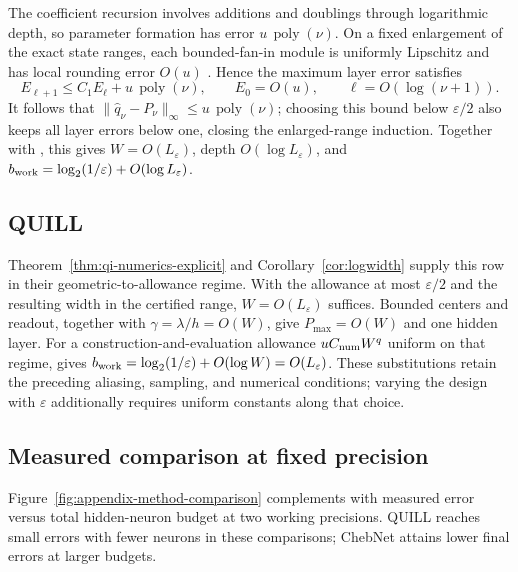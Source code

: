 The coefficient recursion involves additions and doublings through logarithmic
depth, so parameter formation has error $u\,\operatorname{poly}(\nu)$.
On a fixed enlargement of the exact state ranges, each bounded-fan-in module
is uniformly Lipschitz and has local rounding error $O(u)$
\cite[Chs.~2--3]{Higham2002}. Hence the maximum layer error satisfies
\[
 E_{\ell+1}\le C_1E_\ell+u\,\operatorname{poly}(\nu),
 \qquad E_0=O(u),\qquad \ell=O(\log(\nu+1)).
\]
It follows that $\|\widehat q_\nu-P_\nu\|_\infty\le
u\,\operatorname{poly}(\nu)$; choosing this bound below $\varepsilon/2$
also keeps all layer errors below one, closing the enlarged-range induction.
Together with , this gives $W=O(L_\varepsilon)$,
depth $O(\log L_\varepsilon)$, and
$b_{\rm work}=\log_2(1/\varepsilon)+O(\log L_\varepsilon)$.

\subsection{QUILL}
Theorem~\ref{thm:qi-numerics-explicit} and Corollary~\ref{cor:logwidth}
supply this row in their geometric-to-allowance regime. With the allowance
at most $\varepsilon/2$ and the resulting width in the certified range,
$W=O(L_\varepsilon)$ suffices. Bounded centers and readout, together with
$\gamma=\lambda/h=O(W)$, give $P_{\max}=O(W)$ and one hidden layer.
For a construction-and-evaluation allowance $uC_{\rm num}W^q$ uniform on
that regime,  gives
$b_{\rm work}=\log_2(1/\varepsilon)+O(\log W)=O(L_\varepsilon)$.
These substitutions retain the preceding aliasing, sampling, and numerical
conditions; varying the design with $\varepsilon$ additionally requires
uniform constants along that choice.

\subsection{Measured comparison at fixed precision}
\label{app:measured-method-comparison}

Figure~\ref{fig:appendix-method-comparison} complements
\ComparisonTable{} with measured error versus total
hidden-neuron budget at two working precisions. QUILL reaches small errors with fewer neurons in these comparisons;
ChebNet attains lower final errors at larger budgets.


